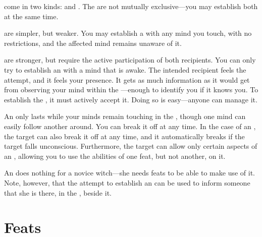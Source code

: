 {\interfaces} come in two kinds: {\overtinterfaces} and {\subtleinterfaces}.
The {\interfaces} are not mutually exclusive---you may establish both at the same time.

{\subtleinterfaces} are simpler, but weaker.
You may establish a {\subtleinterface} with any mind you touch, with no restrictions, and the affected mind remains unaware of it.

{\overtinterfaces} are stronger, but require the active participation of both recipients.
You can only try to establish an {\overtinterface} with a mind that is awake.
The intended recipient feels the attempt, and it feels your presence.
It gets as much information as it would get from observing your mind within the {\mentalrealm}---enough to identify you if it knows you.
To establish the {\interface}, it must actively accept it.
Doing so is easy---anyone can manage it.

An {\interface} only lasts while your minds remain touching in the {\mentalrealm}, though one mind can easily follow another around.
You can break it off at any time.
In the case of an {\overtinterface}, the target can also break it off at any time, and it automatically breaks if the target falls unconscious.
Furthermore, the target can allow only certain aspects of an {\overtinterface}, allowing you to use the abilities of one feat, but not another, on it.

An {\interface} does nothing for a novice witch---she needs feats to be able to make use of it.
Note, however, that the attempt to establish an {\overtinterface} can be used to inform someone that she is there, in the {\mentalrealm}, beside it.

\section{Feats}



